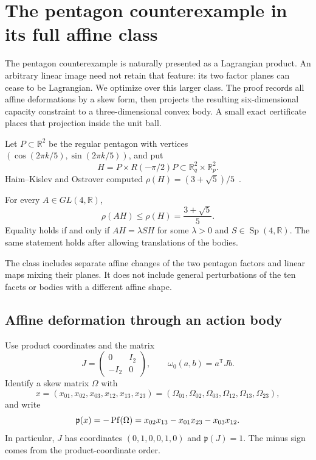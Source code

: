 \section{The pentagon counterexample in its full affine class}
\label{sec:affine-hko}

The pentagon counterexample is naturally presented as a Lagrangian product.
An arbitrary linear image need not retain that feature: its two factor
planes can cease to be Lagrangian. We optimize over this larger class.
The proof records all affine deformations by a skew form, then projects the
resulting six-dimensional capacity constraint to a three-dimensional convex
body. A small exact certificate places that projection inside the unit ball.

Let $P\subset\mathbb R^2$ be the regular pentagon with vertices
$(\cos(2\pi k/5),\sin(2\pi k/5))$, and put
\[
 H=P\times R(-\pi/2)P\subset\mathbb R^2_q\times\mathbb R^2_p.
\]
Haim--Kislev and Ostrover computed
$\rho(H)=(3+\sqrt5)/5$~\cite{HKO2026}.

\begin{theorem}
\label{thm:affine-hko}
For every $A\in GL(4,\mathbb R)$,
\[
 \rho(AH)\leq\rho(H)=\frac{3+\sqrt5}{5}.
\]
Equality holds if and only if $AH=\lambda SH$ for some $\lambda>0$ and
$S\in\operatorname{Sp}(4,\mathbb R)$. The same statement holds after
allowing translations of the bodies.
\end{theorem}

The class includes separate affine changes of the two pentagon factors and
linear maps mixing their planes. It does not include general perturbations
of the ten facets or bodies with a different affine shape.

\subsection{Affine deformation through an action body}
\label{subsec:affine-action-body}

Use product coordinates and the matrix
\[
 J=\begin{pmatrix}0&I_2\\-I_2&0\end{pmatrix},
 \qquad \omega_0(a,b)=a^{\mathsf T}Jb.
\]
Identify a skew matrix $\Omega$ with
\[
 x=(x_{01},x_{02},x_{03},x_{12},x_{13},x_{23})
   =(\Omega_{01},\Omega_{02},\Omega_{03},\Omega_{12},\Omega_{13},\Omega_{23}),
\]
and write
\begin{equation}
 \mathfrak p(x)=-\operatorname{Pf}(\Omega)
 =x_{02}x_{13}-x_{01}x_{23}-x_{03}x_{12}.
 \label{eq:affine-pfaffian}
\end{equation}
In particular, $J$ has coordinates $(0,1,0,0,1,0)$ and
$\mathfrak p(J)=1$. The minus sign comes from the product-coordinate order.


